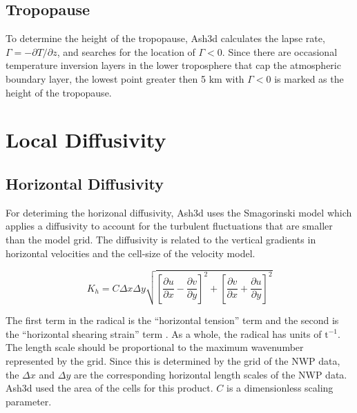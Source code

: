 \subsection{Tropopause}
To determine the height of the tropopause, Ash3d calculates the lapse rate,
$\Gamma = -\partial T/\partial z$, and searches for the location of $\Gamma<0$.
Since there are occasional temperature inversion layers in the lower troposphere
that cap the atmospheric boundary layer,
the lowest point greater then 5 $\mathrm{km}$ with $\Gamma<0$ is marked as the
height of the tropopause.

\section{Local Diffusivity}
\subsection{Horizontal Diffusivity}\label{ChapAppendVarDiff_Sec_Kh}
For deteriming the horizonal diffusivity, Ash3d uses the Smagorinski model which
applies a diffusivity to account for the turbulent fluctuations that are smaller
than the model grid. The diffusivity is related to the vertical gradients in
horizontal velocities and the cell-size of the velocity model.

\begin{equation}\label{VarDiff_Eq_Smag}
K_h = C \Delta x \Delta y \sqrt{\left[ \frac{\partial u}{\partial x} -\frac{\partial v}{\partial y} \right]^2
+ \left[ \frac{\partial v}{\partial x} +\frac{\partial u}{\partial y} \right]^2}
\end{equation}

The first term in the radical is the ``horizontal tension'' term and the second is
the ``horizontal shearing strain'' term \cite{Griffies2000}.
As a whole, the radical has units of $\mathrm{t}^{-1}$.
The length scale should be proportional to the maximum wavenumber represented by the grid.
Since this is determined by the grid of the NWP data, the $\Delta x$ and $\Delta y$ are the 
corresponding horizontal length scales of the NWP data. Ash3d used the area of the cells
for this product. $C$ is a dimensionless scaling parameter.

